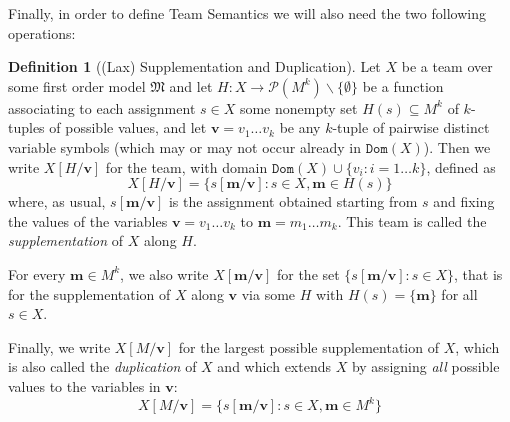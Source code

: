 \documentclass{article}
\theoremstyle{definition}
\newtheorem{Definition}[Theorem]{Definition}
\newcommand{\tuple}{\mathbf}
\newcommand{\M}{\mathfrak M}
\newcommand{\parts}{\mathcal P}
\newcommand{\dom}{\texttt{Dom}}
\begin{document}
Finally, in order to define Team Semantics we will also need the two following operations: 
\begin{Definition}[(Lax) Supplementation and Duplication]
Let $X$ be a team over some first order model $\M$ and let $H: X \rightarrow \parts(M^k) \backslash \{\emptyset\}$ be a function associating to each assignment $s \in X$ some nonempty set $H(s) \subseteq M^k$ of $k$-tuples of possible values, and let $\tuple v = v_1 \ldots v_k$ be any $k$-tuple of pairwise distinct variable symbols (which may or may not occur already in $\dom(X)$). Then we write $X[H/\tuple v]$ for the team, with domain $\dom(X) \cup \{v_i : i = 1 \ldots k\}$, defined as 
\[
X[H/\tuple v] = \{s[\tuple m/\tuple v] : s \in X, \tuple m \in H(s)\}
\]
where, as usual, $s[\tuple m/\tuple v]$ is the assignment obtained starting from $s$ and fixing the values of the variables $\tuple v = v_1 \ldots v_k$ to $\tuple m = m_1 \ldots m_k$. This team is called the \emph{supplementation} of $X$ along $H$.

For every $\tuple m \in M^k$, we also write $X[\tuple m/\tuple v]$ for the set $\{s[\tuple m / \tuple v] : s \in X\}$, that is for the supplementation of $X$ along $\tuple v$ via some $H$ with $H(s) = \{\tuple m\}$ for all $s \in X$.

Finally, we write $X[M/\tuple v]$ for the largest possible supplementation of $X$, which is also called the \emph{duplication} of $X$ and which extends $X$ by assigning \emph{all} possible values to the variables in $\tuple v$:
\[
X[M/\tuple v] = \{s[\tuple m/\tuple v] : s \in X, \tuple m \in M^k\}
\]
\end{Definition}
\end{document}
